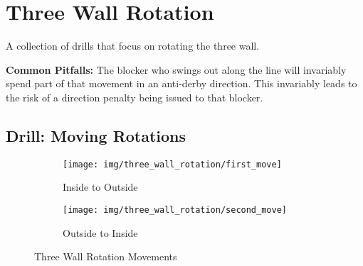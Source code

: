 \section{Three Wall Rotation}
\label{drill:three_wall/rotation}

A collection of drills that focus on rotating the three wall.


{\bf Common Pitfalls:}
The blocker who swings out along the line will invariably spend part of that movement in an anti-derby direction.  
This invariably leads to the risk of a direction penalty being issued to that blocker.

\subsection*{Drill: Moving Rotations} 


\begin{figure}
\begin{subfigure}{0.49\linewidth}
\centering
\texttt{[image: img/three\_wall\_rotation/first\_move]}
\caption{Inside to Outside}
\end{subfigure}
\begin{subfigure}{0.49\linewidth}
\centering
\texttt{[image: img/three\_wall\_rotation/second\_move]}
\caption{Outside to Inside}
\end{subfigure}
\caption{Three Wall Rotation Movements}
\end{figure}
